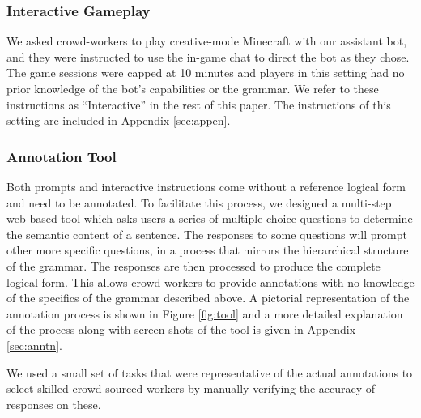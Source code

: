 \subsubsection{Interactive Gameplay}\label{sec:human_bot} We asked crowd-workers to play creative-mode Minecraft with our assistant bot, and they were instructed to use the in-game chat to direct the bot as they chose. The game sessions were capped at 10 minutes and players in this setting had no prior knowledge of the bot's capabilities or the grammar. We refer to these instructions as ``Interactive'' in the rest of this paper.
The instructions of this setting are included in Appendix \ref{sec:appen}. 




\subsubsection{Annotation Tool}
\label{sec:annotation}

Both prompts and interactive instructions come without a reference logical form and need to be annotated. To facilitate this process,
 we designed a multi-step web-based tool which asks users a series of multiple-choice questions to determine the semantic content of a sentence. The responses to some questions will prompt other more specific questions, in a process that mirrors the hierarchical structure of the grammar. The responses are then processed to produce the complete logical form.
This allows crowd-workers to provide annotations with no knowledge of the specifics of the grammar described above. A pictorial representation of the annotation process is shown in Figure \ref{fig:tool} and a more detailed explanation of the process along with screen-shots of the tool is given in Appendix  \ref{sec:anntn}.

We used a small set of tasks that were representative of the actual annotations to select skilled crowd-sourced workers by manually verifying the accuracy of responses on these.

